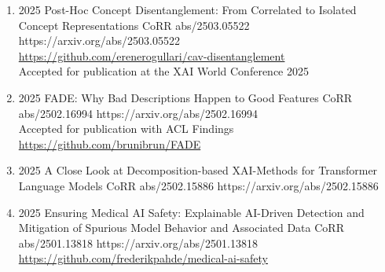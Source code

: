 {\begin{enumerate}
                        
        



        \item {}
                        {2025}
                        {Post-Hoc Concept Disentanglement: From Correlated to Isolated Concept Representations}
                        {CoRR abs/2503.05522}
                        {https://arxiv.org/abs/2503.05522}
                        {
                            \\\href{https://github.com/erenerogullari/cav-disentanglement}{https://github.com/erenerogullari/cav-disentanglement}
                            \\ Accepted for publication at the XAI World Conference 2025
                        }
        
        
        \item {}
                        {2025}
                        {FADE: Why Bad Descriptions Happen to Good Features}
                        {CoRR abs/2502.16994}
                        {https://arxiv.org/abs/2502.16994}
                        {
                            \\Accepted for publication with ACL Findings
                            \\\href{https://github.com/brunibrun/FADE}{https://github.com/brunibrun/FADE}
                        }
                        
                        
        \item {}
                        {2025}
                        {A Close Look at Decomposition-based XAI-Methods for Transformer Language Models}
                        {CoRR abs/2502.15886}
                        {https://arxiv.org/abs/2502.15886}

       
        \item {}
                        {2025}
                        {Ensuring Medical AI Safety: Explainable AI-Driven Detection and Mitigation of Spurious Model Behavior and Associated Data}
                        {CoRR abs/2501.13818}
                        {https://arxiv.org/abs/2501.13818}
                        {
                            \\\href{https://github.com/frederikpahde/medical-ai-safety}{https://github.com/frederikpahde/medical-ai-safety}
                        }


\end{enumerate}}
